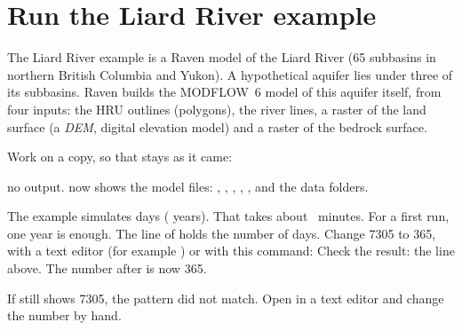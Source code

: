 \section{Run the Liard River example}
The Liard River example is a Raven model of the Liard River (65 subbasins in northern British Columbia and Yukon). A
hypothetical aquifer lies under three of its subbasins. Raven builds the MODFLOW~6 model of this aquifer itself, from four
inputs: the HRU outlines (polygons), the river lines, a raster of the land surface (a \emph{DEM}, digital elevation model)
and a raster of the bedrock surface.

Work on a copy, so that  stays as it came:
\see no output.  now shows the model files: , , , ,
,  and the data folders.

The example simulates  days ( years). That takes about ~minutes. For a first
run, one year is enough. The  line of  holds the number of days. Change 7305 to 365, with a
text editor (for example ) or with this command:
Check the result:
\see the line above. The number after  is now 365.
\begin{trouble}
If  still shows 7305, the  pattern did not match. Open  in a text editor and change the
number by hand.
\end{trouble}

